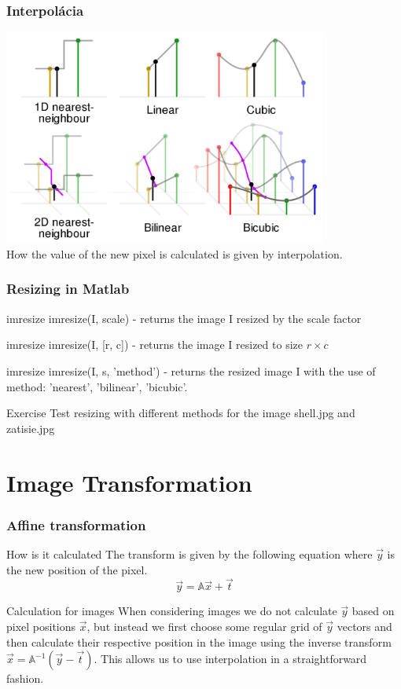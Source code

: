 \documentclass{beamer}
\begin{document}
\begin{frame}
\centering
\frametitle{Interpolácia}
\includegraphics[width=0.8\textwidth]{interpolation.png} \\
How the value of the new pixel is calculated is given by interpolation.
\end{frame}


\begin{frame}
\centering
\frametitle{Resizing in Matlab}
\begin{block}{imresize}
imresize(I, scale) - returns the image I resized by the scale factor
\end{block}

\begin{block}{imresize}
imresize(I, [r, c]) - returns the image I resized to size $r \times c$
\end{block}

\begin{block}{imresize}
imresize(I, s, 'method') - returns the resized image I with the use of method: 'nearest', 'bilinear', 'bicubic'.
\end{block}

\begin{block}{Exercise}
Test resizing with different methods for the image shell.jpg and zatisie.jpg
\end{block}
\end{frame}

\section{Image Transformation}

\begin{frame}
\centering
\frametitle{Affine transformation}
\begin{block}{How is it calculated}
The transform is given by the following equation where $\vec{y}$ is the new position of the pixel.
$$ \vec{y} = \mathbb{A}\vec{x} + \vec{t}$$
\end{block}

\begin{alertblock}{Calculation for images}
When considering images we do not calculate $\vec{y}$ based on pixel positions $\vec{x}$, but instead we first choose some regular grid of $\vec{y}$ vectors and then calculate their respective position in the image using the inverse transform $\vec{x} = \mathbb{A}^{-1} (\vec{y} -\vec{t})$. This allows us to use interpolation in a straightforward fashion.
\end{alertblock}
\end{frame}
\end{document}
